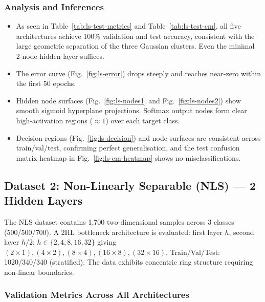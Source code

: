 \documentclass[11pt,a4paper]{article}
\begin{document}
\subsubsection*{Analysis and Inferences}
\begin{itemize}
    \item As seen in Table~\ref{tab:ls-test-metrics} and Table~\ref{tab:ls-test-cm}, all five architectures achieve 100\% validation and test accuracy, consistent with the large geometric separation of the three Gaussian clusters. Even the minimal 2-node hidden layer suffices.
    \item The error curve (Fig.~\ref{fig:ls-error}) drops steeply and reaches near-zero within the first 50 epochs.
    \item Hidden node surfaces (Fig.~\ref{fig:ls-nodes1} and Fig.~\ref{fig:ls-nodes2}) show smooth sigmoid hyperplane projections. Softmax output nodes form clear high-activation regions ($\approx 1$) over each target class.
    \item Decision regions (Fig.~\ref{fig:ls-decision}) and node surfaces are consistent across train/val/test, confirming perfect generalisation, and the test confusion matrix heatmap in Fig.~\ref{fig:ls-cm-heatmap} shows no misclassifications.
\end{itemize}

\subsection{Dataset 2: Non-Linearly Separable (NLS) --- 2 Hidden Layers}

The NLS dataset contains 1,700 two-dimensional samples across 3 classes (500/500/700). A 2HL bottleneck architecture is evaluated: first layer $h$, second layer $h/2$; $h \in \{2,4,8,16,32\}$ giving $(2\times1),(4\times2),(8\times4),(16\times8),(32\times16)$. Train/Val/Test: 1020/340/340 (stratified). The data exhibits concentric ring structure requiring non-linear boundaries.

\subsubsection*{Validation Metrics Across All Architectures}
\end{document}

